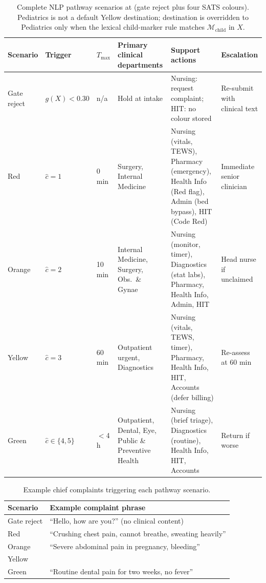 \begin{table}[H]
\centering
\scriptsize
\begin{tabular}{|p{1.5cm}|p{1.6cm}|p{0.9cm}|p{2.4cm}|p{3.1cm}|p{2.2cm}|}
\hline
\textbf{Scenario} & \textbf{Trigger} & \(T_{\max}\) & \textbf{Primary clinical departments} & \textbf{Support actions} & \textbf{Escalation} \\
\hline
Gate reject & \(g(X)<0.30\) & n/a & Hold at intake & Nursing: request complaint; HIT: no colour stored & Re-submit with clinical text \\
Red & \(\hat{c}=1\) & 0 min & Surgery, Internal Medicine & Nursing (vitals, TEWS), Pharmacy (emergency), Health Info (Red flag), Admin (bed bypass), HIT (Code Red) & Immediate senior clinician \\
Orange & \(\hat{c}=2\) & 10 min & Internal Medicine, Surgery, Obs.\ \& Gynae & Nursing (monitor, timer), Diagnostics (stat labs), Pharmacy, Health Info, Admin, HIT & Head nurse if unclaimed \\
Yellow & \(\hat{c}=3\) & 60 min & Outpatient urgent, Diagnostics & Nursing (vitals, TEWS, timer), Pharmacy, Health Info, HIT, Accounts (defer billing) & Re-assess at 60 min \\
Green & \(\hat{c}\in\{4,5\}\) & \(<\)4 h & Outpatient, Dental, Eye, Public \& Preventive Health & Nursing (brief triage), Diagnostics (routine), Health Info, HIT, Accounts & Return if worse \\
\hline
\end{tabular}
\caption{Complete NLP pathway scenarios at \examplehospital{} (gate reject plus four SATS colours). Pediatrics is not a default Yellow destination; destination is overridden to Pediatrics only when the lexical child-marker rule matches \(\mathcal{M}_{\mathrm{child}}\) in \(X\).}
\label{tab:pathway-scenarios}
\end{table}

\begin{table}[H]
\centering
\scriptsize
\begin{tabular}{|l|p{10cm}|}
\hline
\textbf{Scenario} & \textbf{Example complaint phrase} \\
\hline
Gate reject & ``Hello, how are you?'' (no clinical content) \\
Red & ``Crushing chest pain, cannot breathe, sweating heavily'' \\
Orange & ``Severe abdominal pain in pregnancy, bleeding'' \\
Yellow & \runningcomplaint{} \\
Green & ``Routine dental pain for two weeks, no fever'' \\
\hline
\end{tabular}
\caption{Example chief complaints triggering each pathway scenario.}
\label{tab:pathway-examples}
\end{table}

